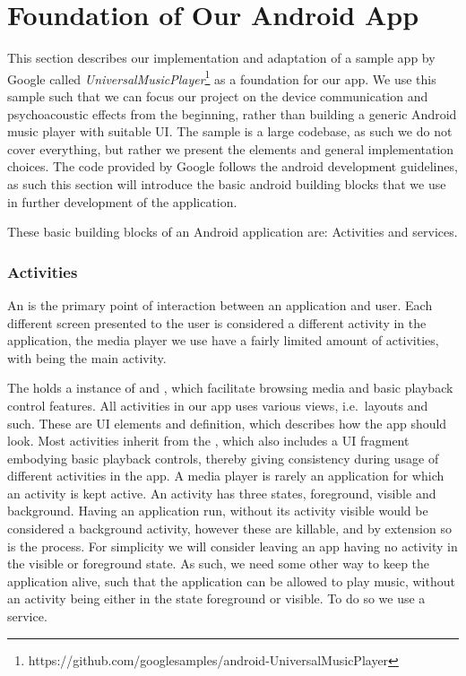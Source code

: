 \section{Foundation of Our Android App}\label{sec:foundation_of_our_android_app}
This section describes our implementation and adaptation of a sample app by Google called \textit{UniversalMusicPlayer}\footnote{https://github.com/googlesamples/android-UniversalMusicPlayer} as a foundation for our app.
We use this sample such that we can focus our project on the device communication and psychoacoustic effects from the beginning, rather than building a generic Android music player with suitable \ac{UI}.
The sample is a large codebase, as such we do not cover everything, but rather we present the elements and general implementation choices.
The code provided by Google follows the android development guidelines, as such this section will introduce the basic android building blocks that we use in further development of the application.

These basic building blocks of an Android application are: Activities and services.

\subsubsection{Activities}\label{subsec:activities}
An  is the primary point of interaction between an application and user.
Each different screen presented to the user is considered a different activity in the application, the media player we use have a fairly limited amount of activities, with  being the main activity.

The  holds a instance of  and , which facilitate browsing media and basic playback control features.
All activities in our app uses various views, i.e.~layouts and such. These are \ac{UI} elements and definition, which describes how the app should look.
Most activities inherit from the , which also includes a \ac{UI} fragment embodying basic playback controls, thereby giving consistency during usage of different activities in the app.
A media player is rarely an application for which an activity is kept active.
An activity has three states, foreground, visible and background.
Having an application run, without its activity visible would be considered a background activity, however these are killable, and by extension so is the process.
For simplicity we will consider leaving an app having no activity in the visible or foreground state.
As such, we need some other way to keep the application alive, such that the application can be allowed to play music, without an activity being either in the state foreground or visible.
To do so we use a service.


